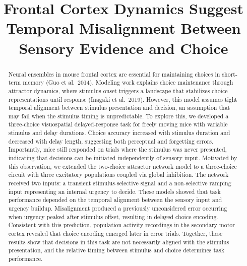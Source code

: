 \documentclass[11pt]{article}
\title{Frontal Cortex Dynamics Suggest Temporal Misalignment Between Sensory Evidence and Choice}
\date{}
\begin{document}
\maketitle
\thispagestyle{empty}

\begin{abstract}
Neural ensembles in mouse frontal cortex are essential for maintaining choices in short-term memory (Guo et al.\ 2014). Modeling work explains choice maintenance through attractor dynamics, where stimulus onset triggers a landscape that stabilizes choice representations until response (Inagaki et al.\ 2019). However, this model assumes tight temporal alignment between stimulus presentation and decision, an assumption that may fail when the stimulus timing is unpredictable. To explore this, we developed a three-choice visuospatial delayed-response task for freely moving mice with variable stimulus and delay durations. Choice accuracy increased with stimulus duration and decreased with delay length, suggesting both perceptual and forgetting errors. Importantly, mice still responded on trials where the stimulus was never presented, indicating that decisions can be initiated independently of sensory input. Motivated by this observation, we extended the two-choice attractor network model to a three-choice circuit with three excitatory populations coupled via global inhibition. The network received two inputs: a transient stimulus-selective signal and a non-selective ramping input representing an internal urgency to decide. These models showed that task performance depended on the temporal alignment between the sensory input and urgency buildup. Misalignment produced a previously unconsidered error occurring when urgency peaked after stimulus offset, resulting in delayed choice encoding. Consistent with this prediction, population activity recordings in the secondary motor cortex revealed that choice encoding emerged later in error trials. Together, these results show that decisions in this task are not necessarily aligned with the stimulus presentation, and the relative timing between stimulus and choice determines task performance.
\end{abstract}
\end{document}
